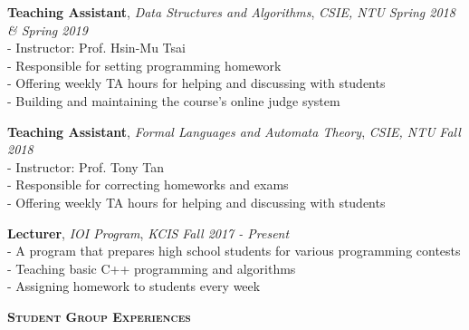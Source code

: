 \documentclass[10pt]{article}
\newenvironment{changemargin}[2]{%
  \begin{list}{}{%
    \setlength{\topsep}{0pt}%
    \setlength{\leftmargin}{#1}%
    \setlength{\rightmargin}{#2}%
    \setlength{\listparindent}{\parindent}%
    \setlength{\itemindent}{\parindent}%
    \setlength{\parsep}{\parskip}%
  }%
  \item[]}{\end{list}
}
\newcommand{\lineover}{
	\begin{changemargin}{-0.05in}{-0.05in}
		\vspace*{-8pt}
		\hrulefill \\
		\vspace*{-2pt}
	\end{changemargin}
}
\newcommand{\header}[1]{
	\begin{changemargin}{-0.5in}{-0.5in}
		\large{\bf \scshape{#1}}\\
  	\lineover
	\end{changemargin}
}
\newenvironment{body} {
	\vspace*{-16pt}
	\begin{changemargin}{-0.25in}{-0.5in}
  }	
	{\end{changemargin}
}
\begin{document}
\begin{body}
	\vspace{14pt}

	\textbf {Teaching Assistant}, {\textit{Data Structures and Algorithms}}, \emph{CSIE, NTU} \hfill \emph{Spring 2018 \& Spring 2019}\\
    	\hspace{12pt} - Instructor: Prof. Hsin-Mu Tsai\\
    	\hspace{12pt} - Responsible for setting programming homework\\
    	\hspace{12pt} - Offering weekly TA hours for helping and discussing with students\\
    	\hspace{12pt} - Building and maintaining the course's online judge system\\
	\smallskip
	
	\textbf {Teaching Assistant}, {\textit{Formal Languages and Automata Theory}}, \emph{CSIE, NTU} \hfill \emph{Fall 2018}\\
    	\hspace{12pt} - Instructor: Prof. Tony Tan\\
    	\hspace{12pt} - Responsible for correcting homeworks and exams\\
    	\hspace{12pt} - Offering weekly TA hours for helping and discussing with students\\
	\smallskip
	
	\textbf {Lecturer}, {\textit{IOI Program}}, \emph{KCIS} \hfill \emph{Fall 2017 - Present}\\
    	\hspace{12pt} - A program that prepares high school students for various programming contests\\
    	\hspace{12pt} - Teaching basic C++ programming and algorithms\\
    	\hspace{12pt} - Assigning homework to students every week\\
	\smallskip

\end{body}

\smallskip


\header{Student Group Experiences}
\end{document}

